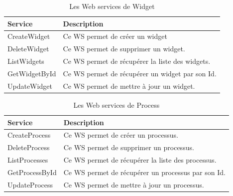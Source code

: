 \begin{table}[H]
    \centering
    \begin{tabular}{|m{5cm}|m{10cm}|}
        \hline
        \textbf{Service} & \textbf{Description}                            \\
        \hline
        CreateWidget     & Ce WS permet de créer un widget                 \\
        \hline
        DeleteWidget     & Ce WS permet de supprimer un widget.            \\
        \hline

        ListWidgets      & Ce WS permet de récupérer la liste des widgets. \\
        \hline

        GetWidgetById    & Ce WS permet de récupérer un widget par son Id. \\
        \hline

        UpdateWidget     & Ce WS permet de mettre à jour un widget.        \\

        \hline
    \end{tabular}
    \caption{Les Web services de Widget}
    \label{tab:my_label}
\end{table}














\begin{table}[H]
    \centering
    \begin{tabular}{|m{5cm}|m{10cm}|}
        \hline
        \textbf{Service} & \textbf{Description}                               \\
        \hline
        CreateProcess    & Ce WS permet de créer un processus.                \\
        \hline
        DeleteProcess    & Ce WS permet de supprimer un processus.            \\
        \hline

        ListProcesses    & Ce WS permet de récupérer la liste des processus.  \\
        \hline

        GetProcessById   & Ce WS permet de récupérer un processus par son Id. \\
        \hline

        UpdateProcess    & Ce WS permet de mettre à jour un processus.        \\

        \hline
    \end{tabular}
    \caption{Les Web services de Process}
    \label{tab:my_label}
\end{table}






